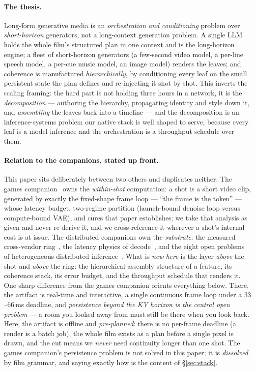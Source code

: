 \documentclass[11pt]{article}
\begin{document}
\paragraph{The thesis.} Long-form generative media is an \emph{orchestration and conditioning} problem over
\emph{short-horizon} generators, not a long-context generation problem. A single LLM holds the whole film's
structured plan in one context and is the long-horizon engine; a fleet of short-horizon generators (a few-second
video model, a per-line speech model, a per-cue music model, an image model) renders the leaves; and coherence is
manufactured \emph{hierarchically}, by conditioning every leaf on the small persistent state the plan defines and
re-injecting it shot by shot. This inverts the scaling framing: the hard part is not holding three hours in a
network, it is the \emph{decomposition} --- authoring the hierarchy, propagating identity and style down it, and
\emph{assembling} the leaves back into a timeline --- and the decomposition is an inference-systems problem our
native stack is well shaped to serve, because every leaf is a model inference and the orchestration is a
throughput schedule over them.

\paragraph{Relation to the companions, stated up front.} This paper sits deliberately between two others and
duplicates neither. The games companion~\cite{games} owns the \emph{within-shot} computation: a shot is a short
video clip, generated by exactly the fixed-shape frame loop --- ``the frame is the token'' --- whose latency
budget, two-regime partition (launch-bound denoise loop versus compute-bound VAE), and cures that paper
establishes; we take that analysis as given and never re-derive it, and we cross-reference it wherever a shot's
internal cost is at issue. The distributed companions own the \emph{substrate}: the measured cross-vendor
ring~\cite{het}, the latency physics of decode~\cite{latency}, and the eight open problems of heterogeneous
distributed inference~\cite{openproblems}. What is \emph{new here} is the layer \emph{above} the shot and
\emph{above} the ring: the hierarchical-assembly structure of a feature, its coherence stack, its error budget,
and the throughput schedule that renders it. One sharp difference from the games companion orients everything
below. There, the artifact is real-time and interactive, a single continuous frame loop under a $33$--$66$\,ms
deadline, and \emph{persistence beyond the KV horizon is the central open problem} --- a room you looked away
from must still be there when you look back. Here, the artifact is offline and \emph{pre-planned}: there is no
per-frame deadline (a render is a batch job), the whole film exists as a plan before a single pixel is drawn,
and the cut means we \emph{never} need continuity longer than one shot. The games companion's persistence
problem is not solved in this paper; it is \emph{dissolved} by film grammar, and saying exactly how is the
content of \S\ref{sec:stack}.
\end{document}
